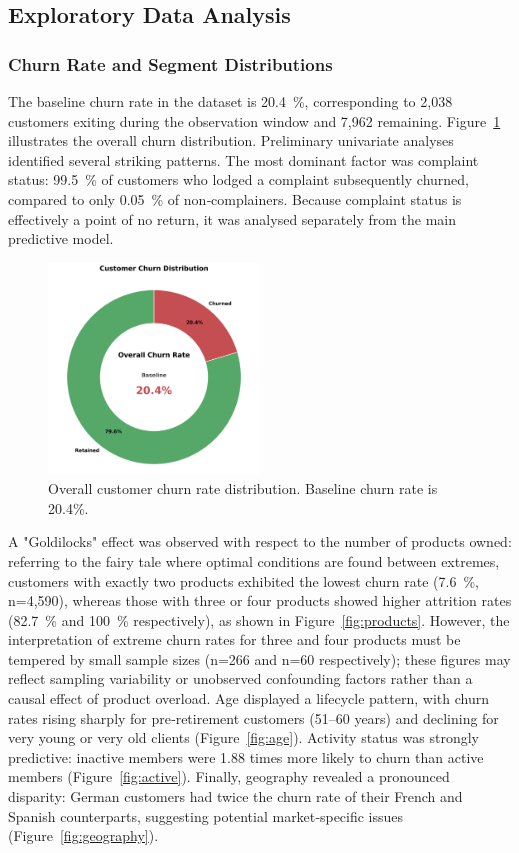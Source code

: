 \documentclass[12pt]{article}
\begin{document}
\subsection{Exploratory Data Analysis}
\subsubsection{Churn Rate and Segment Distributions}
The baseline churn rate in the dataset is 20.4~\%, corresponding to 2,038 customers exiting during the observation window and 7,962 remaining.  Figure~\ref{fig:churn_rate} illustrates the overall churn distribution.  Preliminary univariate analyses identified several striking patterns.  The most dominant factor was complaint status: 99.5~\% of customers who lodged a complaint subsequently churned, compared to only 0.05~\% of non‑complainers.  Because complaint status is effectively a point of no return, it was analysed separately from the main predictive model.

\begin{figure}[H]
\centering
\includegraphics[width=0.5\textwidth]{img/04_products_donut_chart.png}
\caption{Overall customer churn rate distribution. Baseline churn rate is 20.4\%.}
\label{fig:churn_rate}
\end{figure}

A "Goldilocks" effect was observed with respect to the number of products owned: referring to the fairy tale where optimal conditions are found between extremes, customers with exactly two products exhibited the lowest churn rate (7.6~\%, n=4,590), whereas those with three or four products showed higher attrition rates (82.7~\% and 100~\% respectively), as shown in Figure~\ref{fig:products}.  However, the interpretation of extreme churn rates for three and four products must be tempered by small sample sizes (n=266 and n=60 respectively); these figures may reflect sampling variability or unobserved confounding factors rather than a causal effect of product overload.  Age displayed a lifecycle pattern, with churn rates rising sharply for pre‑retirement customers (51–60 years) and declining for very young or very old clients (Figure~\ref{fig:age}).  Activity status was strongly predictive: inactive members were 1.88 times more likely to churn than active members (Figure~\ref{fig:active}).  Finally, geography revealed a pronounced disparity: German customers had twice the churn rate of their French and Spanish counterparts, suggesting potential market‑specific issues (Figure~\ref{fig:geography}).
\end{document}

